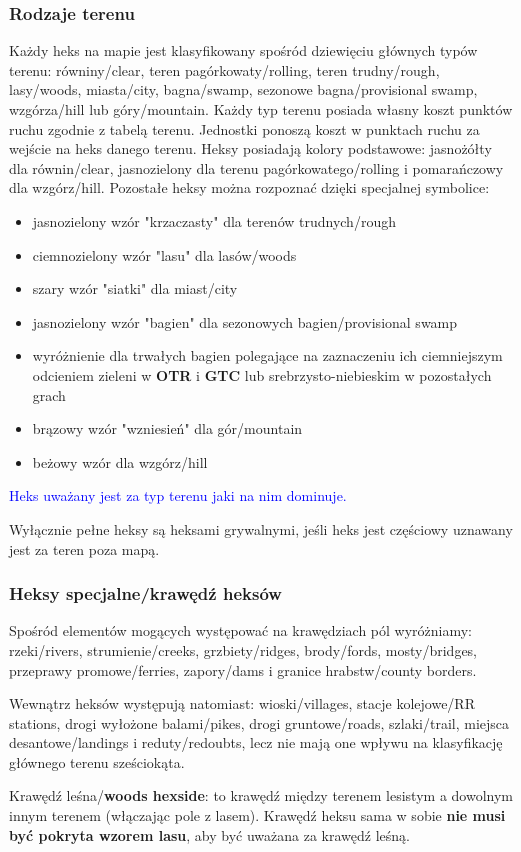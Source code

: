 \documentclass[10pt,twoside,a4paper,table]{article}
\begin{document}
\begin{multicols*}{2}
	\subsubsection*{Rodzaje terenu}
	Każdy heks na mapie jest klasyfikowany spośród dziewięciu głównych typów terenu: równiny/clear, teren pagórkowaty/rolling, teren trudny/rough, lasy/woods, miasta/city, bagna/swamp, sezonowe bagna/provisional swamp, wzgórza/hill lub góry/mountain. Każdy typ terenu posiada własny koszt punktów ruchu zgodnie z tabelą terenu. Jednostki ponoszą koszt w punktach ruchu za wejście na heks danego terenu. Heksy posiadają kolory podstawowe: jasnożółty dla równin/clear, jasnozielony dla terenu pagórkowatego/rolling i pomarańczowy dla wzgórz/hill. Pozostałe heksy można rozpoznać dzięki specjalnej symbolice:
	\begin{itemize}
		\item jasnozielony wzór "krzaczasty" dla terenów trudnych/rough
		\item ciemnozielony wzór "lasu" dla lasów/woods
		\item szary wzór "siatki" dla miast/city
		\item jasnozielony wzór "bagien" dla sezonowych bagien/provisional swamp
		\item wyróżnienie dla trwałych bagien polegające na zaznaczeniu ich ciemniejszym odcieniem zieleni w \textbf{OTR} i \textbf{GTC} lub srebrzysto-niebieskim w pozostałych grach
		\item brązowy wzór "wzniesień" dla gór/mountain
		\item beżowy wzór dla wzgórz/hill
	\end{itemize}
	\textcolor{blue}{Heks uważany jest za typ terenu jaki na nim dominuje.}\par
	Wyłącznie pełne heksy są heksami grywalnymi, jeśli heks jest częściowy uznawany jest za teren poza mapą.
	\subsubsection*{Heksy specjalne/krawędź heksów}
	Spośród elementów mogących występować na krawędziach pól wyróżniamy: rzeki/rivers, strumienie/creeks, grzbiety/ridges, brody/fords, mosty/bridges, przeprawy promowe/ferries, zapory/dams i granice hrabstw/county borders.\par
	Wewnątrz heksów występują natomiast: wioski/villages, stacje kolejowe/RR stations, drogi wyłożone balami/pikes, drogi gruntowe/roads, szlaki/trail, miejsca desantowe/landings i reduty/redoubts, lecz nie mają one wpływu na klasyfikację głównego terenu sześciokąta.\par
	Krawędź leśna/\textbf{woods hexside}: to krawędź między terenem lesistym a dowolnym innym terenem (włączając pole z lasem). Krawędź heksu sama w sobie \textbf{nie musi być pokryta wzorem lasu}, aby być uważana za krawędź leśną.

\end{multicols*}
\end{document}
